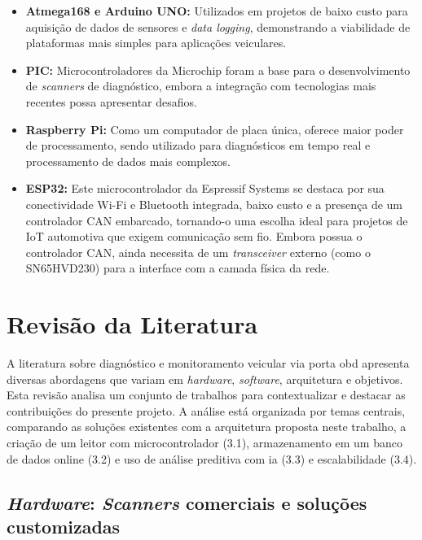 \documentclass[a4paper, 12pt]{article}
\begin{document}
\begin{itemize}

\item \textbf{Atmega168 e Arduino UNO:} Utilizados em projetos de baixo custo para aquisição de dados de sensores e \textit{data logging}, demonstrando a viabilidade de plataformas mais simples para aplicações veiculares.

\item \textbf{PIC:} Microcontroladores da Microchip foram a base para o desenvolvimento de \textit{scanners} de diagnóstico, embora a integração com tecnologias mais recentes possa apresentar desafios.

\item \textbf{Raspberry Pi:} Como um computador de placa única, oferece maior poder de processamento, sendo utilizado para diagnósticos em tempo real e processamento de dados mais complexos.

\item \textbf{ESP32:} Este microcontrolador da Espressif Systems se destaca por sua conectividade Wi-Fi e Bluetooth integrada, baixo custo e a presença de um controlador CAN embarcado, tornando-o uma escolha ideal para projetos de IoT automotiva que exigem comunicação sem fio. Embora possua o controlador CAN, ainda necessita de um \textit{transceiver} externo (como o SN65HVD230) para a interface com a camada física da rede.

\end{itemize}

\clearpage

\section{Revisão da Literatura}

A literatura sobre diagnóstico e monitoramento veicular via porta \acrshort{obd} apresenta diversas abordagens que variam em \textit{hardware}, \textit{software}, arquitetura e objetivos. Esta revisão analisa um conjunto de trabalhos para contextualizar e destacar as contribuições do presente projeto. A análise está organizada por temas centrais, comparando as soluções existentes com a arquitetura proposta neste trabalho, a criação de um leitor com microcontrolador (3.1), armazenamento em um banco de dados online (3.2) e uso de análise preditiva com \acrshort{ia} (3.3) e escalabilidade (3.4).

\subsection{\textit{Hardware}: \textit{Scanners} comerciais e soluções customizadas} 
\end{document}
